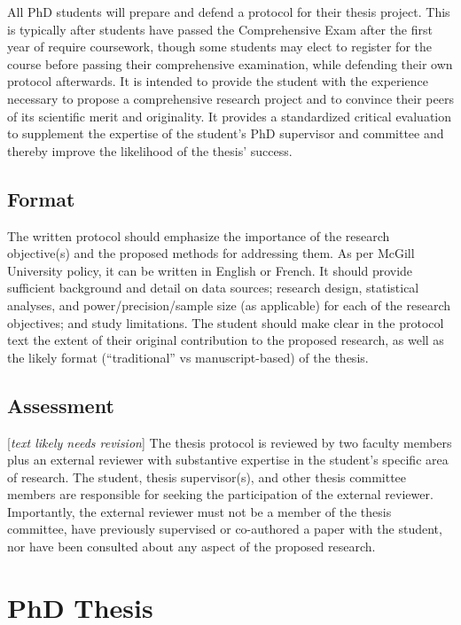 \documentclass[
]{book}
\begin{document}
All PhD students will prepare and defend a protocol for their thesis project. This is typically after students have passed the Comprehensive Exam after the first year of require coursework, though some students may elect to register for the course before passing their comprehensive examination, while defending their own protocol afterwards. It is intended to provide the student with the experience necessary to propose a comprehensive research project and to convince their peers of its scientific merit and originality. It provides a standardized critical evaluation
to supplement the expertise of the student's PhD supervisor and committee and thereby improve the likelihood of the thesis' success.

\hypertarget{format}{%
\section{Format}\label{format}}

The written protocol should emphasize the importance of the research objective(s) and the proposed methods for addressing them. As per McGill University policy, it can be written in English or French. It should provide sufficient background and detail on data sources; research design, statistical analyses, and power/precision/sample size (as applicable) for each of the research objectives; and study limitations. The student should make clear in the protocol text the extent of their original contribution to the proposed research, as well as the likely format (``traditional'' vs manuscript-based) of the thesis.

\hypertarget{assessment}{%
\section{Assessment}\label{assessment}}

{[}\emph{text likely needs revision}{]}
The thesis protocol is reviewed by two faculty members plus an external reviewer with substantive expertise in the student's specific area of research. The student, thesis supervisor(s), and other thesis committee members are responsible for seeking the participation of the external reviewer. Importantly, the external reviewer must not be a member of the thesis committee, have previously supervised or co-authored a paper with the student, nor have been consulted about any aspect of the proposed research.

\hypertarget{phd-thesis}{%
\chapter{PhD Thesis}\label{phd-thesis}}
\end{document}

